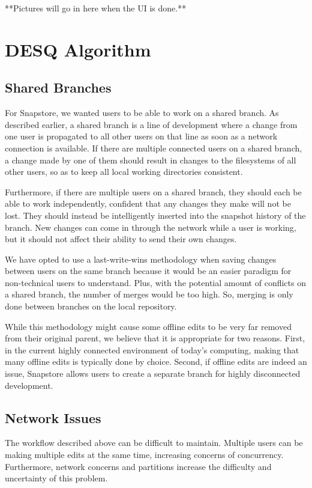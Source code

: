 **Pictures will go in here when the UI is done.**

\section{DESQ Algorithm}

\subsection{Shared Branches}

For Snapstore, we wanted users to be able to work on a shared branch. As described earlier, a shared branch is a line of development where a change from one user is propagated to all other users on that line as soon as a network connection is available. If there are multiple connected users on a shared branch, a change made by one of them should result in changes to the filesystems of all other users, so as to keep all local working directories consistent.

Furthermore, if there are multiple users on a shared branch, they should each be able to work independently, confident that any changes they make will not be lost. They should instead be intelligently inserted into the snapshot history of the branch. New changes can come in through the network while a user is working, but it should not affect their ability to send their own changes.

We have opted to use a last-write-wins methodology when saving changes between users on the same branch because it would be an easier paradigm for non-technical users to understand. Plus, with the potential amount of conflicts on a shared branch, the number of merges would be too high. So, merging is only done between branches on the local repository.

While this methodology might cause some offline edits to be very far removed from their original parent, we believe that it is appropriate for two reasons. First, in the current highly connected environment of today's computing, making that many offline edits is typically done by choice. Second, if offline edits are indeed an issue, Snapstore allows users to create a separate branch for highly disconnected development. 

\subsection{Network Issues}

The workflow described above can be difficult to maintain. Multiple users can be making multiple edits at the same time, increasing concerns of concurrency.  Furthermore, network concerns and partitions increase the difficulty and uncertainty of this problem. 

